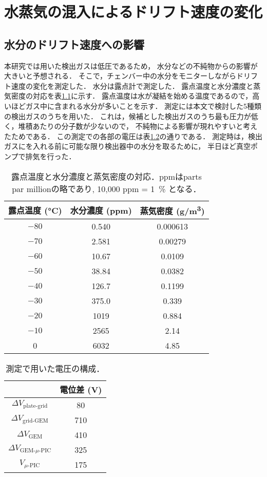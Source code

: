 \documentclass[../master]{subfiles}
\begin{document}
\chapter{水蒸気の混入によるドリフト速度の変化}
\label{app::drift_speed_humid_dep}
\section{水分のドリフト速度への影響}
本研究では用いた検出ガスは低圧であるため，
水分などの不純物からの影響が大きいと予想される．
そこで，チェンバー中の水分をモニターしながらドリフト速度の変化を測定した．
水分は露点計で測定した．
露点温度と水分濃度と蒸気密度の対応を表\ref{tab::dew_point_humidity}に示す．
露点温度は水が凝結を始める温度であるので，高いほどガス中に含まれる水分が多いことを示す．
測定には本文で検討した5種類の検出ガスのうち\Methane を用いた．
これは，候補とした検出ガスのうち最も圧力が低く，堆積あたりの分子数が少ないので，
不純物による影響が現れやすいと考えたためである．
この測定での各部の電圧は表\ref{tab::configuration_for_drift_dep}の通りである．
測定時は，検出ガスにを入れる前に可能な限り検出器中の水分を取るために，
半日ほど真空ポンプで排気を行った．
\begin{table}
  \centering
  \caption{露点温度と水分濃度と蒸気密度の対応．ppmはparts par millionの略であり, 10,000 ppm = \SI{1}{\percent} となる．}
  \label{tab::dew_point_humidity}
  \begin{tabular}{ccc}
    \toprule
    露点温度 (\si{\degreeCelsius}) & 水分濃度 (ppm) & 蒸気密度 (\si{\gram/\cubic\metre}) \\
    \midrule
    $-80$ & 0.540 & 0.000613 \\
    $-70$ & 2.581 & 0.00279 \\
    $-60$ & 10.67 & 0.0109 \\
    $-50$ & 38.84 & 0.0382 \\
    $-40$ & 126.7 & 0.1199 \\
    $-30$ & 375.0 & 0.339 \\
    $-20$ & 1019 & 0.884 \\
    $-10$ & 2565 & 2.14 \\
    0     & 6032 & 4.85 \\
    \bottomrule
  \end{tabular}
\end{table}
\begin{table}
  \centering
  \caption{測定で用いた電圧の構成．}
  \label{tab::configuration_for_drift_dep}
  \begin{tabular}{cc}
    \toprule
    & 電位差 (\si{\volt}) \\
    \midrule
    $\Delta V_{\text{plate-grid}}$ & 80 \\
    $\Delta V_{\text{grid-GEM}}$ & 710 \\
    $\Delta V_{\text{GEM}}$ & 410 \\
    $\Delta V_{\text{GEM-}\mu\text{-PIC}}$ & 325 \\
    $V_{\mu\text{-PIC}}$ & 175 \\
    \bottomrule
  \end{tabular}
\end{table}
\end{document}
